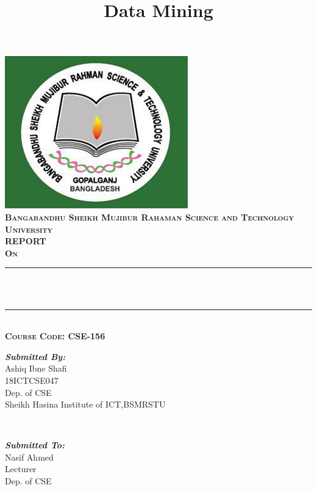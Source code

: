 \documentclass[a4paper,10pt]{article}
\title{ Data Mining}
\makeatletter
\let\thetitle\@title
\makeatother
\begin{document}

\begin{titlepage}
	\centering
    \vspace*{0.5 cm}
    \includegraphics[scale = 0.75]{logo.jpg}\\[1.0 cm]	%
    \textsc{\LARGE \bfseries Bangabandhu Sheikh Mujibur Rahaman Science and Technology University}\\[1 cm]	%
	\textsc{\LARGE \bfseries REPORT}\\[0.5 cm]
	\textsc{\Large \bfseries On}\\[0.5 cm]
	\rule{\linewidth}{0.2 mm} \\[0.4 cm]
	{ \huge \bfseries \thetitle}\\
	\rule{\linewidth}{0.2 mm} \\[0.5 cm]
	\textsc{\LARGE \bfseries Course Code: \large CSE-156}\\[0.5 cm]
	
	\begin{minipage}{0.4\textwidth}
		\begin{flushleft} \large
			\emph{\LARGE \bfseries Submitted By:}\\
			\Large Ashiq Ibne Shafi\\
             18ICTCSE047\\
            Dep. of CSE\\
            Sheikh Hasina Institute of ICT,BSMRSTU\\
			\end{flushleft}
			\end{minipage}~
			\begin{minipage}{0.5\textwidth}
            
			\begin{flushright} \large
			\emph{\LARGE \bfseries Submitted To:} \\
			 Nasif Ahmed\\
            Lecturer\\
            Dep. of CSE\\
     

\end{flushright}
\end{minipage}
\end{titlepage}
\end{document}
